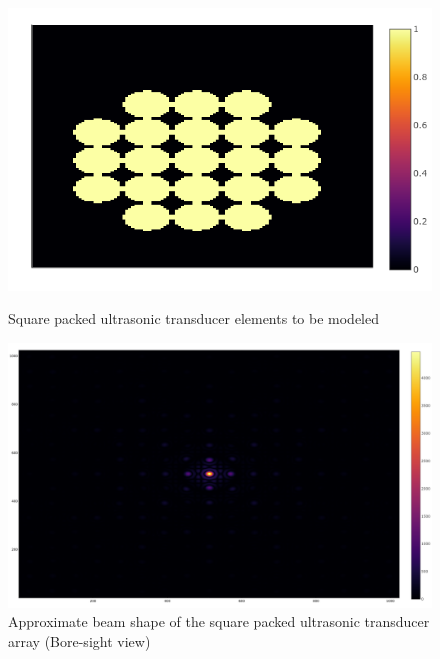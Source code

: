 \begin{figure}[h!]
\centering

    \begin{minipage}{0.4\textwidth}
    \centering
    \includegraphics[width= \textwidth]{Figures/arraySim/sqr/arraylayoutcircular.png}
    \caption{Square packed ultrasonic transducer elements to be modeled}
    \label{fig:sqr_elem}
    \end{minipage}\hfill
    \begin{minipage}{0.4\textwidth}
    \centering
    \includegraphics[width= \textwidth]{Figures/arraySim/sqr/circ_sqr_beamTop.png}
    \caption{Approximate beam shape of the square packed ultrasonic transducer array (Bore-sight view)}
    \label{fig:sqr_elem_topBeam}
    \end{minipage}
    
\end{figure}


